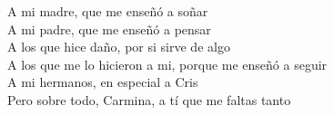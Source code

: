 

\renewcommand{\contentsname}{Índice General}
\renewcommand{\listtablename}{Lista de Tablas}
\renewcommand{\tablename}{Tabla}



\newpage
\thispagestyle{empty}
\begin{flushright}
	\phantom{blank}
	\vspace{25mm}

	A mi madre, que me enseñó a soñar \\
	A mi padre, que me enseñó a pensar  \\
	A los que hice daño, por si sirve de algo  \\
	A los que me lo hicieron a mi, porque me enseñó a seguir  \\
	A mi hermanos, en especial a Cris  \\
	Pero sobre todo, Carmina, a tí que me faltas tanto  \\
\end{flushright}


\tableofcontents
\newpage
\cleardoublepage
\listoffigures %
\cleardoublepage
\listoftables %

\lstlistoflistings

\newpage	